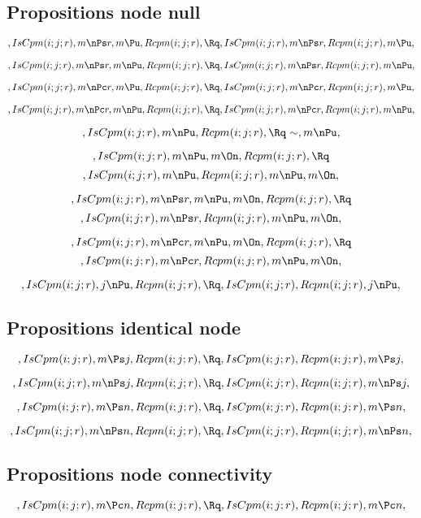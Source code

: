 \bigskip
\bigskip
\subsection{Propositions node null}
\[, IsCpm(i;j;r), m \nPs r, m \Pu, Rcpm(i;j;r), \Rq , IsCpm(i;j;r), m \nPs r, Rcpm(i;j;r), m \Pu,\]

\[, IsCpm(i;j;r), m \nPs r, m \nPu, Rcpm(i;j;r), \Rq , IsCpm(i;j;r), m \nPs r, Rcpm(i;j;r), m \nPu,\]

\[, IsCpm(i;j;r), m \nPc r, m \Pu, Rcpm(i;j;r), \Rq , IsCpm(i;j;r), m \nPc r, Rcpm(i;j;r), m \Pu,\]

\[, IsCpm(i;j;r), m \nPc r, m \nPu, Rcpm(i;j;r), \Rq , IsCpm(i;j;r), m \nPc r, Rcpm(i;j;r), m \nPu,\]

\[, IsCpm(i;j;r), m \nPu, Rcpm(i;j;r), \Rq \sim, m \nPu,\]

\[, IsCpm(i;j;r),  m \nPu, m \On, Rcpm(i;j;r), \Rq \]
\[, IsCpm(i;j;r), m \nPu, Rcpm(i;j;r), m \nPu, m \On,\]


\[, IsCpm(i;j;r), m \nPs r, m \nPu, m \On, Rcpm(i;j;r), \Rq \]
\[, IsCpm(i;j;r), m \nPs r, Rcpm(i;j;r), m \nPu, m \On,\]

\[, IsCpm(i;j;r), m \nPc r, m \nPu, m \On, Rcpm(i;j;r), \Rq \]
\[, IsCpm(i;j;r), m \nPc r, Rcpm(i;j;r), m \nPu, m \On,\]

\[, IsCpm(i;j;r), j \nPu, Rcpm(i;j;r), \Rq , IsCpm(i;j;r), Rcpm(i;j;r), j \nPu,\]



\bigskip
\bigskip
\subsection{Propositions identical node}
\[, IsCpm(i;j;r), m \Ps j, Rcpm(i;j;r), \Rq , IsCpm(i;j;r), Rcpm(i;j;r), m \Ps j,\]


\[, IsCpm(i;j;r), m \nPs j, Rcpm(i;j;r), \Rq , IsCpm(i;j;r), Rcpm(i;j;r), m \nPs j,\]


\[, IsCpm(i;j;r), m \Ps n, Rcpm(i;j;r), \Rq , IsCpm(i;j;r), Rcpm(i;j;r), m \Ps n,\]


\[, IsCpm(i;j;r), m \nPs n, Rcpm(i;j;r), \Rq , IsCpm(i;j;r), Rcpm(i;j;r), m \nPs n,\]




\bigskip
\bigskip
\subsection{Propositions  node connectivity}
\[, IsCpm(i;j;r), m \Pc n, Rcpm(i;j;r), \Rq , IsCpm(i;j;r), Rcpm(i;j;r), m \Pc n,\]

